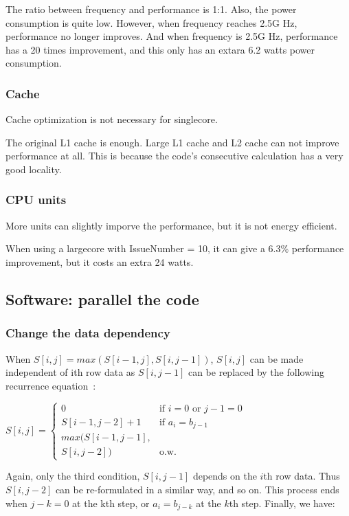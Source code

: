 \documentclass[twocolumn,letterpaper,10pt]{article}
\begin{document}
The ratio between frequency and performance is 1:1. Also, the power
consumption is quite low. However, when frequency reaches 2.5G Hz,
performance no longer improves. And when frequency is 2.5G Hz,
performance has a 20 times improvement, and this only has an extara
6.2 watts power consumption.

\subsubsection{Cache}

Cache optimization is not necessary for singlecore.

The original L1 cache is enough. Large L1 cache and L2 cache can not
improve performance at all. This is because the code's consecutive
calculation has a very good locality.

\subsubsection{CPU units}

More units can slightly imporve the performance, but it is not energy
efficient.

When using a largecore with IssueNumber = 10, it can give a 6.3\%
performance improvement, but it costs an extra 24 watts.

\subsection{Software: parallel the code}

\subsubsection{Change the data dependency}

When $S[i,j]=max(S[i-1,j],S[i,j-1]) $, $ S[i,j] $ can be made
independent of ith row data as $ S[i,j-1] $ can be replaced by the
following recurrence equation~\cite{parallel}:

$ S[i,j] =
\begin{cases}
  0 & \text{if }i=0\text{ or }j-1=0 \\
  S[i-1,j-2]+1 & \text{if }a_i=b_{j-1} \\
  max(S[i-1,j-1], \\ S[i,j-2]) & \text{o.w.}
\end{cases} $

Again, only the third condition, $ S[i,j-1] $ depends on the $i$th row
data. Thus $ S[i,j-2] $ can be re-formulated in a similar way, and so
on. This process ends when $ j-k=0 $ at the kth step, or $ a_i=b_{j-k}
$ at the $k$th step. Finally, we have:
\end{document}
